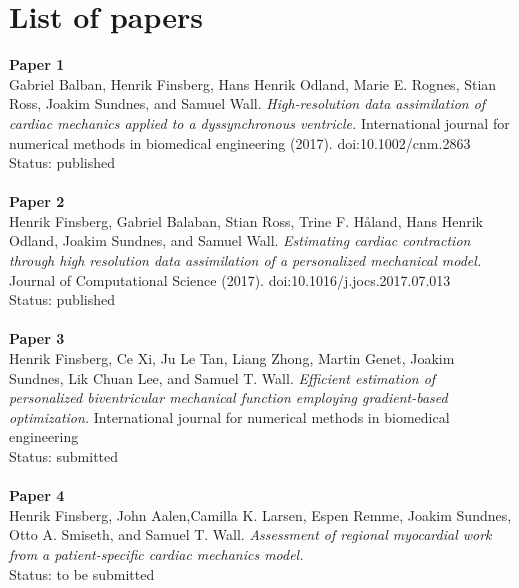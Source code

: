 
\section*{List of papers}

\textbf{Paper 1}
\hfill  \\ \noindent
Gabriel Balban, Henrik Finsberg, Hans Henrik Odland, Marie
E. Rognes, Stian Ross, Joakim Sundnes, and Samuel
Wall. \emph{High-resolution data assimilation of cardiac mechanics
  applied to a dyssynchronous ventricle.}  International journal for
numerical methods in biomedical engineering
(2017). doi:10.1002/cnm.2863
Status: published
\\\\
\noindent
\textbf{Paper 2} 
\hfill  \\ 
Henrik Finsberg, Gabriel Balaban,  Stian Ross, Trine F. H\r{a}land,
Hans Henrik Odland, Joakim Sundnes, and Samuel
Wall. \emph{Estimating cardiac contraction through high resolution
  data assimilation of a personalized mechanical model.} Journal of
Computational Science (2017). doi:10.1016/j.jocs.2017.07.013
\\Status: published
\\\\
\noindent
\textbf{Paper 3}
\hfill  \\
Henrik Finsberg, Ce Xi,  Ju Le Tan,  Liang Zhong, Martin Genet, Joakim
Sundnes, Lik Chuan Lee, and Samuel T. Wall.
\emph{Efficient estimation of personalized biventricular mechanical
  function employing gradient-based optimization.} International
journal for numerical methods in biomedical engineering
\\Status: submitted
\\\\
\noindent
\textbf{Paper 4}
\hfill  \\
Henrik Finsberg, John Aalen,Camilla K.
Larsen, Espen Remme, Joakim Sundnes, Otto A. Smiseth, and 
Samuel T. Wall.
\emph{Assessment of regional myocardial work from a
patient-specific cardiac mechanics model.} 
\\Status: to be submitted

